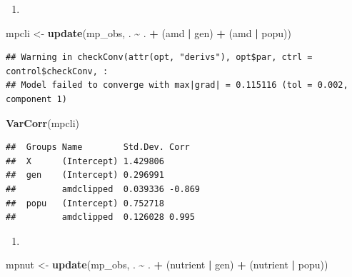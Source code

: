 \documentclass[
  12pt,
]{book}
\newenvironment{Shaded}{\begin{snugshade}}{\end{snugshade}}
\newcommand{\KeywordTok}[1]{\textcolor[rgb]{0.13,0.29,0.53}{\textbf{#1}}}
\newcommand{\NormalTok}[1]{#1}
\newcommand{\OperatorTok}[1]{\textcolor[rgb]{0.81,0.36,0.00}{\textbf{#1}}}
\newcommand{\StringTok}[1]{\textcolor[rgb]{0.31,0.60,0.02}{#1}}
\providecommand{\tightlist}{%
  \setlength{\itemsep}{0pt}\setlength{\parskip}{0pt}}
\begin{document}
\begin{enumerate}
\def\labelenumi{\arabic{enumi}.}
\tightlist
\item
\end{enumerate}

\begin{Shaded}
\begin{Highlighting}[]
\NormalTok{mpcli \textless{}{-}}\StringTok{ }\KeywordTok{update}\NormalTok{(mp\_obs, . }\OperatorTok{\textasciitilde{}}\StringTok{ }\NormalTok{. }\OperatorTok{+}\StringTok{ }\NormalTok{(amd }\OperatorTok{|}\StringTok{ }\NormalTok{gen) }\OperatorTok{+}\StringTok{ }\NormalTok{(amd }\OperatorTok{|}\StringTok{ }\NormalTok{popu))}
\end{Highlighting}
\end{Shaded}

\begin{verbatim}
## Warning in checkConv(attr(opt, "derivs"), opt$par, ctrl = control$checkConv, :
## Model failed to converge with max|grad| = 0.115116 (tol = 0.002, component 1)
\end{verbatim}

\begin{Shaded}
\begin{Highlighting}[]
\KeywordTok{VarCorr}\NormalTok{(mpcli)}
\end{Highlighting}
\end{Shaded}

\begin{verbatim}
##  Groups Name        Std.Dev. Corr  
##  X      (Intercept) 1.429806       
##  gen    (Intercept) 0.296991       
##         amdclipped  0.039336 -0.869
##  popu   (Intercept) 0.752718       
##         amdclipped  0.126028 0.995
\end{verbatim}

\begin{enumerate}
\def\labelenumi{\arabic{enumi}.}
\setcounter{enumi}{1}
\tightlist
\item
\end{enumerate}

\begin{Shaded}
\begin{Highlighting}[]
\NormalTok{mpnut \textless{}{-}}\StringTok{ }\KeywordTok{update}\NormalTok{(mp\_obs, . }\OperatorTok{\textasciitilde{}}\StringTok{ }\NormalTok{. }\OperatorTok{+}\StringTok{ }\NormalTok{(nutrient }\OperatorTok{|}\StringTok{ }\NormalTok{gen) }\OperatorTok{+}\StringTok{ }\NormalTok{(nutrient }\OperatorTok{|}\StringTok{ }\NormalTok{popu))}
\end{Highlighting}
\end{Shaded}
\end{document}
